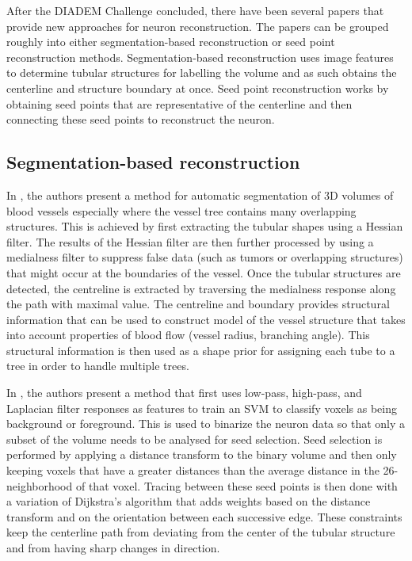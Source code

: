 After the DIADEM Challenge concluded, there have been several
papers that provide new approaches for neuron reconstruction.  The
papers can be grouped roughly into either segmentation-based
reconstruction or seed point reconstruction methods. Segmentation-based
reconstruction uses image features to determine tubular structures
for labelling the volume and as such obtains the centerline and
structure boundary at once. Seed point reconstruction works by
obtaining seed points that are representative of the centerline
and then connecting these seed points to reconstruct the neuron.

\subsection{Segmentation-based reconstruction}

In \textcite{Bauer2010}, the authors present a method for
automatic segmentation of 3D volumes of blood
vessels especially where the vessel tree
contains many overlapping structures. This
is achieved by first extracting the
tubular shapes using a Hessian filter. The
results of the Hessian filter are then
further processed by using a medialness filter
to suppress false data (such as tumors or
overlapping structures) that might occur at
the boundaries of the vessel. Once the
tubular structures are detected, the
centreline is extracted by traversing the
medialness response along the path with
maximal value. The centreline and boundary provides structural
information that can be used to construct
model of the vessel structure that takes
into account properties of blood flow
(vessel radius, branching angle). This
structural information is then used as
a shape prior for assigning each tube to a
tree in order to handle multiple
trees.

In \textcite{Jimenez2013}, the authors
present a method that first uses low-pass, high-pass, and Laplacian filter responses
as features to train an \acrshort{SVM} to classify voxels as
being background or foreground. This is
used to binarize the neuron data so that
only a subset of the volume needs to be
analysed for seed selection. Seed
selection is performed by applying a
distance transform to the binary volume
and then only keeping voxels that have a
greater distances than the average
distance in the 26-neighborhood of that
voxel. Tracing between these seed points
is then done with a variation of
Dijkstra's algorithm that adds weights
based on the distance transform
and on the orientation between each successive
edge. These constraints keep the centerline path
from deviating from the center of the
tubular structure and from having sharp
changes in direction.

